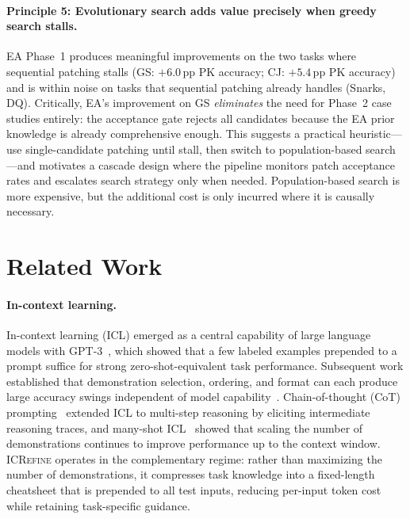 \paragraph{Principle 5: Evolutionary search adds value precisely when greedy search stalls.}
EA Phase~1 produces meaningful improvements on the two tasks where sequential patching
stalls (GS: $+6.0$\,pp PK accuracy; CJ: $+5.4$\,pp PK accuracy) and is within noise on
tasks that sequential patching already handles (Snarks, DQ).
Critically, EA's improvement on GS \emph{eliminates} the need for Phase~2 case studies
entirely: the acceptance gate rejects all candidates because the EA prior knowledge is
already comprehensive enough.
This suggests a practical heuristic---use single-candidate patching until stall, then switch
to population-based search---and motivates a cascade design where the pipeline monitors
patch acceptance rates and escalates search strategy only when needed.
Population-based search is more expensive, but the additional cost is only incurred where it
is causally necessary.


\section{Related Work}
\label{sec:related}

\paragraph{In-context learning.}
In-context learning (ICL) emerged as a central capability of large language models with
GPT-3~\citep{brown2020gpt3}, which showed that a few labeled examples prepended to a prompt
suffice for strong zero-shot-equivalent task performance.
Subsequent work established that demonstration selection, ordering, and format can each
produce large accuracy swings independent of model capability~\citep{zhao2021calibrate,lu2022order}.
Chain-of-thought (CoT) prompting~\citep{wei2022cot} extended ICL to multi-step reasoning
by eliciting intermediate reasoning traces, and many-shot ICL~\citep{agarwal2024manyshot}
showed that scaling the number of demonstrations continues to improve performance up to the
context window.
\textsc{ICRefine} operates in the complementary regime: rather than maximizing the number of
demonstrations, it compresses task knowledge into a fixed-length cheatsheet that is prepended
to all test inputs, reducing per-input token cost while retaining task-specific guidance.

